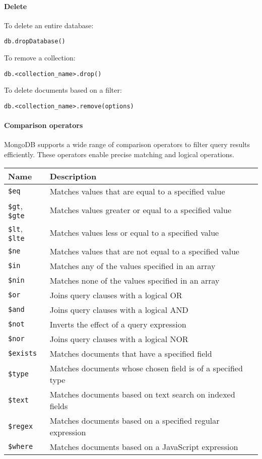 \paragraph*{Delete}
To delete an entire database:
\begin{lstlisting}[style=MongoDB]
db.dropDatabase()
\end{lstlisting}
To remove a collection:
\begin{lstlisting}[style=MongoDB]
db.<collection_name>.drop()
\end{lstlisting}
To delete documents based on a filter: 
\begin{lstlisting}[style=MongoDB]
db.<collection_name>.remove(options)
\end{lstlisting}

\paragraph*{Comparison operators}
MongoDB supports a wide range of comparison operators to filter query results efficiently. 
These operators enable precise matching and logical operations. 
\begin{longtable}{|l|p{10cm}|}
    \hline \textbf{Name} & \textbf{Description} \\ \hline
    \texttt{\$eq} & Matches values that are equal to a specified value \\ \hline
    \texttt{\$gt}, \texttt{\$gte} & Matches values greater or equal to a specified value \\ \hline
    \texttt{\$lt}, \texttt{\$lte} & Matches values less or equal to a specified value \\ \hline
    \texttt{\$ne} & Matches values that are not equal to a specified value \\ \hline
    \texttt{\$in} & Matches any of the values specified in an array \\ \hline
    \texttt{\$nin} & Matches none of the values specified in an array \\ \hline
    \texttt{\$or} & Joins query clauses with a logical OR \\ \hline
    \texttt{\$and} & Joins query clauses with a logical AND \\ \hline
    \texttt{\$not} & Inverts the effect of a query expression \\ \hline
    \texttt{\$nor} & Joins query clauses with a logical NOR \\ \hline
    \texttt{\$exists} & Matches documents that have a specified field \\ \hline
    \texttt{\$type} & Matches documents whose chosen field is of a specified type \\ \hline
    \texttt{\$text} & Matches documents based on text search on indexed fields \\ \hline
    \texttt{\$regex} & Matches documents based on a specified regular expression \\ \hline
    \texttt{\$where} & Matches documents based on a JavaScript expression \\ \hline
\end{longtable}

